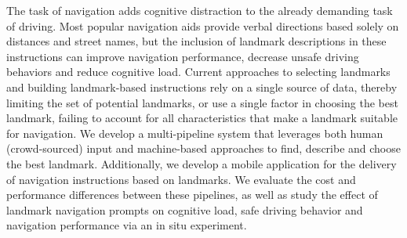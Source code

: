 The task of navigation adds cognitive distraction to the already demanding task of driving. Most popular navigation aids provide verbal directions based solely on distances and street names, but the inclusion of landmark descriptions in these instructions can improve navigation performance, decrease unsafe driving behaviors and reduce cognitive load. Current approaches to selecting landmarks and building landmark-based instructions rely on a single source of data, thereby limiting the set of potential landmarks, or use a single factor in choosing the best landmark, failing to account for all characteristics that make a landmark suitable for navigation. We develop a multi-pipeline system that leverages both human (crowd-sourced) input and machine-based approaches to find, describe and choose the best landmark. Additionally, we develop a mobile application for the delivery of navigation instructions based on landmarks. We evaluate the cost and performance differences between these pipelines, as well as study the effect of landmark navigation prompts on cognitive load, safe driving behavior and navigation performance via an in situ experiment.

